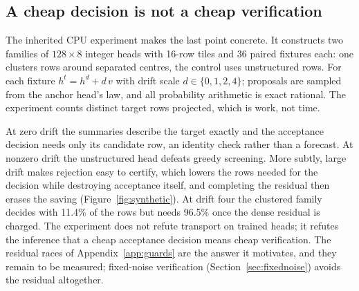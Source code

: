 \subsection{A cheap decision is not a cheap verification}\label{sec:synthetic}\label{app:synthetic}
The inherited CPU experiment makes the last point concrete. It constructs two families of $128\times8$ integer heads with 16-row tiles and 36 paired fixtures each: one clusters rows around separated centres, the control uses unstructured rows. For each fixture $h^t=h^d+d\,v$ with drift scale $d\in\{0,1,2,4\}$; proposals are sampled from the anchor head's law, and all probability arithmetic is exact rational. The experiment counts distinct target rows projected, which is work, not time.

At zero drift the summaries describe the target exactly and the acceptance decision needs only its candidate row, an identity check rather than a forecast. At nonzero drift the unstructured head defeats greedy screening. More subtly, large drift makes rejection easy to certify, which lowers the rows needed for the decision while destroying acceptance itself, and completing the residual then erases the saving (Figure~\ref{fig:synthetic}). At drift four the clustered family decides with 11.4\% of the rows but needs 96.5\% once the dense residual is charged. The experiment does not refute transport on trained heads; it refutes the inference that a cheap acceptance decision means cheap verification. The residual races of Appendix~\ref{app:guards} are the answer it motivates, and they remain to be measured; fixed-noise verification (Section~\ref{sec:fixednoise}) avoids the residual altogether.

